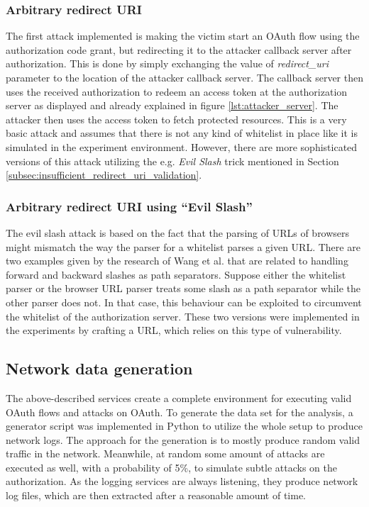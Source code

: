 \documentclass[
    fontsize=12pt,
    headings=small,
    parskip=half,           %
    bibliography=totoc,
    numbers=noenddot,       %
    open=any,               %
    ]{scrreprt}
\begin{document}
\subsubsection{Arbitrary redirect URI}
The first attack implemented is making the victim start an OAuth flow using the authorization code grant, but redirecting it to the attacker callback server after authorization. This is done by simply exchanging the value of \emph{redirect\_uri} parameter to the location of the attacker callback server. The callback server then uses the received authorization to redeem an access token at the authorization server as displayed and already explained in figure \ref{lst:attacker_server}. The attacker then uses the access token to fetch protected resources. This is a very basic attack and assumes that there is not any kind of whitelist in place like it is simulated in the experiment environment. However, there are more sophisticated versions of this attack utilizing the e.g. \emph{Evil Slash} \cite{wang2019make} trick mentioned in Section \ref{subsec:insufficient_redirect_uri_validation}. 

\subsubsection{Arbitrary redirect URI using ``Evil Slash''}
The evil slash attack is based on the fact that the parsing of URLs of browsers might mismatch the way the parser for a whitelist parses a given URL. There are two examples given by the research of Wang et al. that are related to handling forward and backward slashes as path separators. Suppose either the whitelist parser or the browser URL parser treats some slash as a path separator while the other parser does not. In that case, this behaviour can be exploited to circumvent the whitelist of the authorization server. These two versions were implemented in the experiments by crafting a URL, which relies on this type of vulnerability.

\subsection{Network data generation}
The above-described services create a complete environment for executing valid OAuth flows and attacks on OAuth. To generate the data set for the analysis, a generator script was implemented in Python to utilize the whole setup to produce network logs. The approach for the generation is to mostly produce random valid traffic in the network. Meanwhile, at random some amount of attacks are executed as well, with a probability of 5\%, to simulate subtle attacks on the authorization. As the logging services are always listening, they produce network log files, which are then extracted after a reasonable amount of time.
\end{document}
